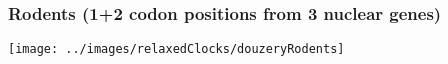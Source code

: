 \begin{frame}
\frametitle{Rodents (1+2 codon positions from 3 nuclear genes)}

\begin{centering}

\texttt{[image: ../images/relaxedClocks/douzeryRodents]}

\end{centering}

\end{frame}